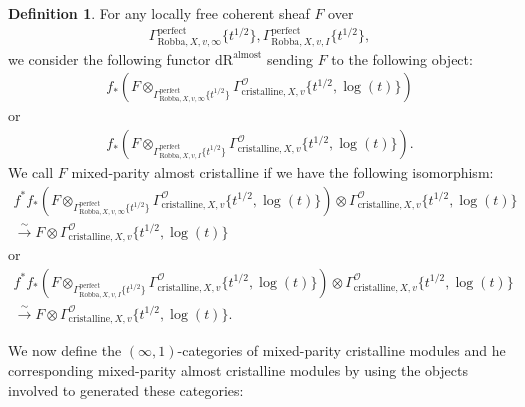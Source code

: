 \documentclass[12pt]{book}
\theoremstyle{definition}
\newtheorem{definition}{Definition}
\begin{document}
\begin{definition}
For any locally free coherent sheaf $F$ over
\begin{align}
\Gamma^\mathrm{perfect}_{\text{Robba},X,v,\infty}\{t^{1/2}\},\Gamma^\mathrm{perfect}_{\text{Robba},X,v,I}\{t^{1/2}\},
\end{align} 
we consider the following functor $\mathrm{dR}^\mathrm{almost}$ sending $F$ to the following object:
\begin{align}
f_*(F\otimes_{\Gamma^\mathrm{perfect}_{\text{Robba},X,v,\infty}\{t^{1/2}\}} \Gamma^\mathcal{O}_{\text{cristalline},X,v}\{t^{1/2},\log(t)\})
\end{align}
or 
\begin{align}
f_*(F\otimes_{\Gamma^\mathrm{perfect}_{\text{Robba},X,v,I}\{t^{1/2}\}} \Gamma^\mathcal{O}_{\text{cristalline},X,v}\{t^{1/2},\log(t)\}).
\end{align}
We call $F$ mixed-parity almost cristalline if we have the following isomorphism:
\begin{align}
f^*f_*(F\otimes_{\Gamma^\mathrm{perfect}_{\text{Robba},X,v,\infty}\{t^{1/2}\}} \Gamma^\mathcal{O}_{\text{cristalline},X,v}\{t^{1/2},\log(t)\}) \otimes \Gamma^\mathcal{O}_{\text{cristalline},X,v}\{t^{1/2},\log(t)\} \\
\overset{\sim}{\longrightarrow} F \otimes \Gamma^\mathcal{O}_{\text{cristalline},X,v}\{t^{1/2},\log(t)\} 
\end{align}
or 
\begin{align}
f^*f_*(F\otimes_{\Gamma^\mathrm{perfect}_{\text{Robba},X,v,I}\{t^{1/2}\}} \Gamma^\mathcal{O}_{\text{cristalline},X,v}\{t^{1/2},\log(t)\}) \otimes \Gamma^\mathcal{O}_{\text{cristalline},X,v}\{t^{1/2},\log(t)\}\\ \overset{\sim}{\longrightarrow} F \otimes \Gamma^\mathcal{O}_{\text{cristalline},X,v}\{t^{1/2},\log(t)\}. 
\end{align}
\end{definition}

\noindent We now define the $(\infty,1)$-categories of mixed-parity cristalline modules and he corresponding mixed-parity almost cristalline modules by using the objects involved to generated these categories:
\end{document}
